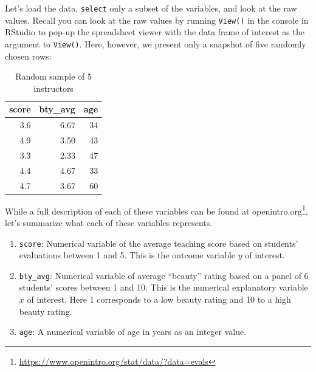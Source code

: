 \documentclass[12pt,]{krantz}
\makeatletter
\newenvironment{Shaded}{\begin{snugshade}}{\end{snugshade}}
\newcommand{\KeywordTok}[1]{\textcolor[rgb]{0.27,0.27,0.27}{\textbf{#1}}}
\newcommand{\DecValTok}[1]{\textcolor[rgb]{0.06,0.06,0.06}{#1}}
\newcommand{\StringTok}[1]{\textcolor[rgb]{0.5,0.5,0.5}{#1}}
\newcommand{\OperatorTok}[1]{\textcolor[rgb]{0.43,0.43,0.43}{\textbf{#1}}}
\newcommand{\NormalTok}[1]{#1}
\providecommand{\tightlist}{%
  \setlength{\itemsep}{0pt}\setlength{\parskip}{0pt}}
\renewcommand{\href}[2]{#2\footnote{\url{#1}}}
\newenvironment{kframe}{%
\medskip{}
\setlength{\fboxsep}{.8em}
 \def\at@end@of@kframe{}%
 \ifinner\ifhmode%
  \def\at@end@of@kframe{\end{minipage}}%
  \begin{minipage}{\columnwidth}%
 \fi\fi%
 \def\FrameCommand##1{\hskip\@totalleftmargin \hskip-\fboxsep
 \colorbox{shadecolor}{##1}\hskip-\fboxsep
     \hskip-\linewidth \hskip-\@totalleftmargin \hskip\columnwidth}%
 \MakeFramed {\advance\hsize-\width
   \@totalleftmargin\z@ \linewidth\hsize
   \@setminipage}}%
 {\par\unskip\endMakeFramed%
 \at@end@of@kframe}
\renewenvironment{Shaded}{\begin{kframe}}{\end{kframe}}
\theoremstyle{definition}
\theoremstyle{definition}
\theoremstyle{definition}
\theoremstyle{remark}
\makeatother
\begin{document}
Let's load the data, \texttt{select} only a subset of the variables, and
look at the raw values. Recall you can look at the raw values by running
\texttt{View()} in the console in RStudio to pop-up the spreadsheet
viewer with the data frame of interest as the argument to
\texttt{View()}. Here, however, we present only a snapshot of five
randomly chosen rows:

\begin{Shaded}
\end{Shaded}

\begin{Shaded}
\end{Shaded}

\begin{table}[H]

\caption{\label{tab:unnamed-chunk-166}Random sample of 5 instructors}
\centering
\fontsize{10}{12}\selectfont
\begin{tabular}[t]{rrr}
\toprule
score & bty\_avg & age\\
\midrule
3.6 & 6.67 & 34\\
4.9 & 3.50 & 43\\
3.3 & 2.33 & 47\\
4.4 & 4.67 & 33\\
4.7 & 3.67 & 60\\
\bottomrule
\end{tabular}
\end{table}

While a full description of each of these variables can be found at
\href{https://www.openintro.org/stat/data/?data=evals}{openintro.org},
let's summarize what each of these variables represents.

\begin{enumerate}
\def\labelenumi{\arabic{enumi}.}
\tightlist
\item
  \texttt{score}: Numerical variable of the average teaching score based
  on students' evaluations between 1 and 5. This is the outcome variable
  \(y\) of interest.
\item
  \texttt{bty\_avg}: Numerical variable of average ``beauty'' rating
  based on a panel of 6 students' scores between 1 and 10. This is the
  numerical explanatory variable \(x\) of interest. Here 1 corresponds
  to a low beauty rating and 10 to a high beauty rating.
\item
  \texttt{age}: A numerical variable of age in years as an integer
  value.
\end{enumerate}
\end{document}
